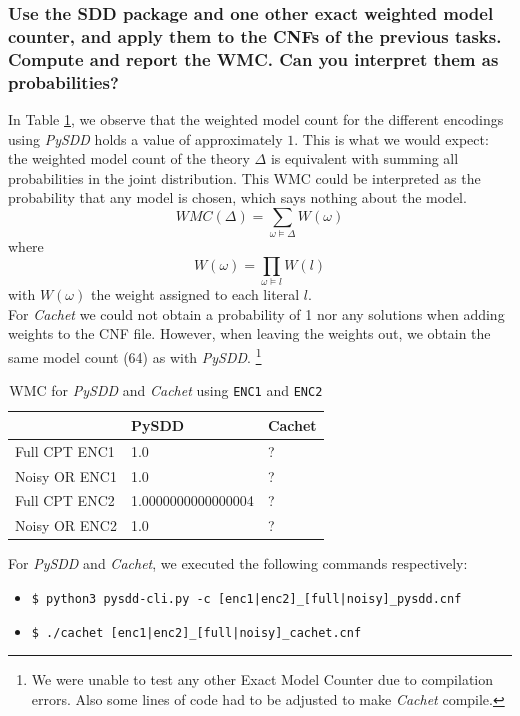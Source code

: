 \documentclass{article}
\begin{document}
\subsubsection{Use the SDD package and one other exact weighted model counter, and apply them to the CNFs of the previous tasks. Compute and report the WMC. Can you interpret them as probabilities?}
In Table \ref{tab:wmc_pysdd_cachet}, we observe that the weighted model count for the different encodings using  \textit{PySDD} holds a value of approximately $1$. This is what we would expect: the weighted model count of the theory $\Delta$ is equivalent with summing all probabilities in the joint distribution. This WMC could be interpreted as the probability that any model is chosen, which says nothing about the model. 
$$WMC(\Delta) = \sum_{\omega \models \Delta} W(\omega)$$
where
$$W(\omega) = \prod_{\omega \models l}W(l)$$
with $W(\omega)$ the weight assigned to each literal $l$.\cite{chavira}\\
For \textit{Cachet} we could not obtain a probability of 1 nor any solutions when adding weights to the CNF file. However, when leaving the weights out, we obtain the same model count (64) as with \textit{PySDD}.
\footnote{We were unable to test any other Exact Model Counter due to compilation errors. Also some lines of code had to be adjusted to make \textit{Cachet} compile.}
\begin{table}[h]
\centering
\begin{tabular}{l | l l}
					&	PySDD	&		Cachet	\\\hline
	Full CPT ENC1	&	1.0		&		?		\\
	Noisy OR ENC1	&	1.0		&		?		\\
	Full CPT ENC2	&	1.0000000000000004 &	?	\\
	Noisy OR ENC2	&	1.0		&		?		\\
\end{tabular}
\caption{WMC for \textit{PySDD} and \textit{Cachet} using \texttt{ENC1} and \texttt{ENC2}}
\label{tab:wmc_pysdd_cachet}
\end{table}

For \textit{PySDD} and \textit{Cachet}, we executed the following commands respectively:
\begin{itemize}
	\item[] \texttt{\$ python3 pysdd-cli.py -c [enc1|enc2]\_[full|noisy]\_pysdd.cnf}
	\item[] \texttt{\$ ./cachet [enc1|enc2]\_[full|noisy]\_cachet.cnf}
\end{itemize}
\end{document}
